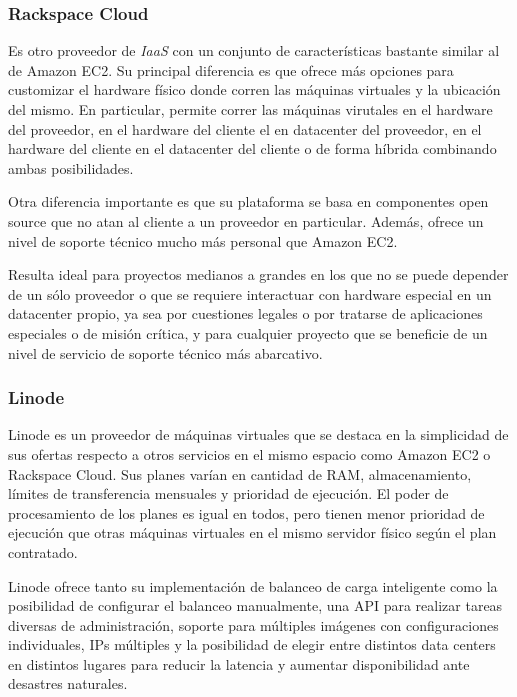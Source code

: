 \documentclass[a4paper,10pt,twoside]{article}
\begin{document}
\subsubsection{Rackspace Cloud}

Es otro proveedor de \emph{IaaS} con un conjunto de características bastante similar al de Amazon EC2. Su principal diferencia es que ofrece más opciones para customizar el hardware físico donde corren las máquinas virtuales y la ubicación del mismo. En particular, permite correr las máquinas virutales en el hardware del proveedor, en el hardware del cliente el en datacenter del proveedor, en el hardware del cliente en el datacenter del cliente o de forma híbrida combinando ambas posibilidades.

Otra diferencia importante es que su plataforma se basa en componentes open source que no atan al cliente a un proveedor en particular. Además, ofrece un nivel de soporte técnico mucho más personal que Amazon EC2.

Resulta ideal para proyectos medianos a grandes en los que no se puede depender de un sólo proveedor o que se requiere interactuar con hardware especial en un datacenter propio, ya sea por cuestiones legales o por tratarse de aplicaciones especiales o de misión crítica, y para cualquier proyecto que se beneficie de un nivel de servicio de soporte técnico más abarcativo.


\subsubsection{Linode}

Linode es un proveedor de máquinas virtuales que se destaca en la simplicidad de sus ofertas respecto a otros servicios en el mismo espacio como Amazon EC2 o Rackspace Cloud. Sus planes varían en cantidad de RAM, almacenamiento, límites de transferencia mensuales y prioridad de ejecución. El poder de procesamiento de los planes es igual en todos, pero tienen menor prioridad de ejecución que otras máquinas virtuales en el mismo servidor físico según el plan contratado.

Linode ofrece tanto su implementación de balanceo de carga inteligente como la posibilidad de configurar el balanceo manualmente, una API para realizar tareas diversas de administración, soporte para múltiples imágenes con configuraciones individuales, IPs múltiples y la posibilidad de elegir entre distintos data centers en distintos lugares para reducir la latencia y aumentar disponibilidad ante desastres naturales.
\end{document}
